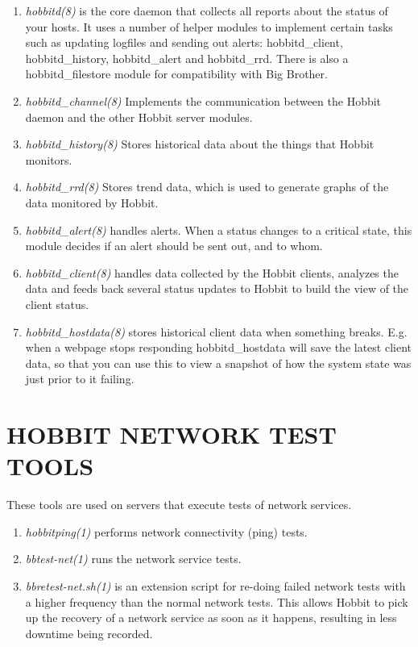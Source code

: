 \begin{enumerate}

 \item \emph{hobbitd(8)} is the core daemon that collects all reports about
 the status of your hosts. It uses a number of helper modules to
 implement certain tasks such as updating logfiles and sending out
 alerts: hobbitd\_client, hobbitd\_history, hobbitd\_alert and
 hobbitd\_rrd. There is also a hobbitd\_filestore module for
 compatibility with Big Brother. 



 \item \emph{hobbitd\_channel(8)}
 Implements the communication between the Hobbit daemon and the other Hobbit server modules. 


 \item \emph{hobbitd\_history(8)}
 Stores historical data about the things that Hobbit monitors. 


 \item \emph{hobbitd\_rrd(8)}
 Stores trend data, which is used to generate graphs of the data monitored by Hobbit. 


 \item \emph{hobbitd\_alert(8)}
 handles alerts. When a status changes to a critical state, this module decides if an alert should be sent out, and to whom. 


 \item \emph{hobbitd\_client(8)}
 handles data collected by the Hobbit clients, analyzes the data and feeds back several status updates to Hobbit to build the view of the client status. 


 \item \emph{hobbitd\_hostdata(8)}
 stores historical client data when something breaks. E.g. when a
 webpage stops responding hobbitd\_hostdata will save the latest
 client data, so that you can use this to view a snapshot of how the
 system state was just prior to it failing. 


\end{enumerate}
 
\section{HOBBIT NETWORK TEST TOOLS}

These tools are used on servers that execute tests of network
services. 

\begin{enumerate}

 \item \emph{hobbitping(1)}
 performs network connectivity (ping) tests. 


 \item \emph{bbtest-net(1)}
 runs the network service tests. 


 \item \emph{bbretest-net.sh(1)} is an extension script for re-doing failed
 network tests with a higher frequency than the normal network
 tests. This allows Hobbit to pick up the recovery of a network
 service as soon as it happens, resulting in less downtime being
 recorded. 

\end{enumerate}



